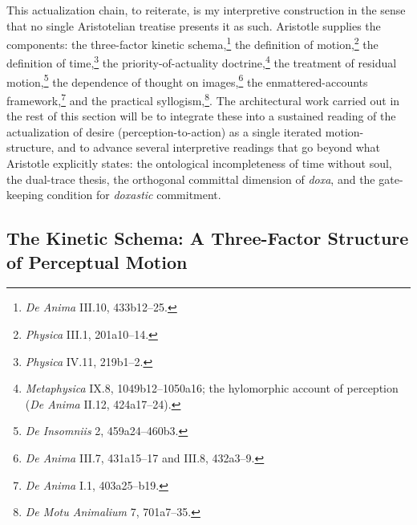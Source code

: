 \documentclass{article}
\begin{document}
This actualization chain, to reiterate, is my interpretive construction in the sense that no single Aristotelian treatise presents it as such. Aristotle supplies the components: the three-factor kinetic schema,\footnote{\textit{De Anima} III.10, 433b12--25.} the definition of motion,\footnote{\textit{Physica} III.1, 201a10--14.} the definition of time,\footnote{\textit{Physica} IV.11, 219b1--2.} the priority-of-actuality doctrine,\footnote{\textit{Metaphysica} IX.8, 1049b12--1050a16; the hylomorphic account of perception (\textit{De Anima} II.12, 424a17--24).} the treatment of residual motion,\footnote{\textit{De Insomniis} 2, 459a24--460b3.} the dependence of thought on images,\footnote{\textit{De Anima} III.7, 431a15--17 and III.8, 432a3--9.} the enmattered-accounts framework,\footnote{\textit{De Anima} I.1, 403a25--b19.} and the practical syllogism,\footnote{\textit{De Motu Animalium} 7, 701a7--35.}. The architectural work carried out in the rest of this section will be to integrate these into a sustained reading of the actualization of desire (perception-to-action) as a single iterated motion-structure, and to advance several interpretive readings that go beyond what Aristotle explicitly states: the ontological incompleteness of time without soul, the dual-trace thesis, the orthogonal committal dimension of \textit{doxa}, and the gate-keeping condition for \textit{doxastic} commitment. 

\subsection{The Kinetic Schema: A Three-Factor Structure of Perceptual Motion}
\end{document}
